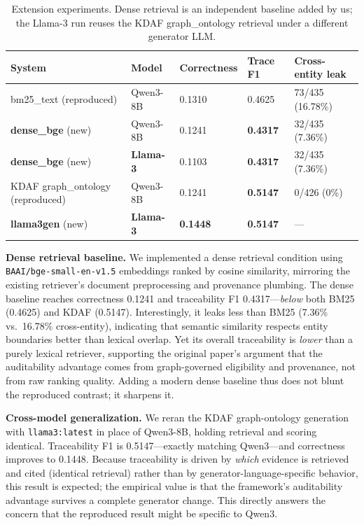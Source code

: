 \documentclass[11pt]{article}
\begin{document}
\begin{table}[h]
\centering
\caption{Extension experiments. Dense retrieval is an independent baseline added by us; the Llama-3 run reuses the KDAF graph\_ontology retrieval under a different generator LLM.}
\label{tab:ext}
\small
\begin{tabular}{@{}l l l l l@{}}
\toprule
\textbf{System} & \textbf{Model} & \textbf{Correctness} & \textbf{Trace F1} & \textbf{Cross-entity leak} \\
\midrule
bm25\_text (reproduced) & Qwen3-8B & 0.1310 & 0.4625 & 73/435 (16.78\%) \\
\textbf{dense\_bge} (new) & Qwen3-8B & 0.1241 & \textbf{0.4317} & 32/435 (7.36\%) \\
\textbf{dense\_bge} (new) & \textbf{Llama-3} & 0.1103 & \textbf{0.4317} & 32/435 (7.36\%) \\
KDAF graph\_ontology (reproduced) & Qwen3-8B & 0.1241 & \textbf{0.5147} & 0/426 (0\%) \\
\textbf{llama3gen} (new) & \textbf{Llama-3} & \textbf{0.1448} & \textbf{0.5147} & --- \\
\bottomrule
\end{tabular}
\end{table}

\textbf{Dense retrieval baseline.} We implemented a dense retrieval condition using \texttt{BAAI/bge-small-en-v1.5} embeddings ranked by cosine similarity, mirroring the existing retriever's document preprocessing and provenance plumbing. The dense baseline reaches correctness 0.1241 and traceability F1 0.4317---\emph{below} both BM25 (0.4625) and KDAF (0.5147). Interestingly, it leaks less than BM25 (7.36\% vs.\ 16.78\% cross-entity), indicating that semantic similarity respects entity boundaries better than lexical overlap. Yet its overall traceability is \emph{lower} than a purely lexical retriever, supporting the original paper's argument that the auditability advantage comes from graph-governed eligibility and provenance, not from raw ranking quality. Adding a modern dense baseline thus does not blunt the reproduced contrast; it sharpens it.

\textbf{Cross-model generalization.} We reran the KDAF graph-ontology generation with \texttt{llama3:latest} in place of Qwen3-8B, holding retrieval and scoring identical. Traceability F1 is 0.5147---exactly matching Qwen3---and correctness improves to 0.1448. Because traceability is driven by \emph{which} evidence is retrieved and cited (identical retrieval) rather than by generator-language-specific behavior, this result is expected; the empirical value is that the framework's auditability advantage survives a complete generator change. This directly answers the concern that the reproduced result might be specific to Qwen3.
\end{document}
